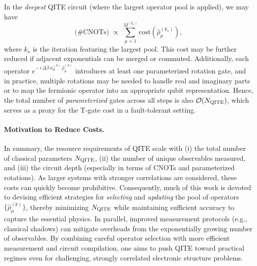 \documentclass[aip,jcp,amsmath,amssymb, reprint]{revtex4-1}
\begin{document}
In the \textit{deepest} QITE circuit (where the largest operator pool is applied), we may have 
\[
\text{(\# CNOTs)} \;\propto\; \sum_{\mu=1}^{M^{(k_\star)}} \!\!\text{cost}(\hat{\rho}_\mu^{(k_\star)}),
\]
where $k_\star$ is the iteration featuring the largest pool. This cost may be further reduced if adjacent exponentials can be merged or commuted.\cite{mcardle2020quantum} Additionally, each operator \(e^{-\,i\,\Delta \beta\,\alpha_\mu^{(k)} \,\hat{\rho}_\mu^{(k)}}\) introduces at least one parameterized rotation gate, and in practice, multiple rotations may be needed to handle real and imaginary parts or to map the fermionic operator into an appropriate qubit representation. Hence, the total number of \textit{parameterized} gates across all steps is also $\mathcal{O}(N_{\rm{QITE}})$, which serves as a proxy for the T-gate cost in a fault-tolerant setting. 

\paragraph{Motivation to Reduce Costs.}
In summary, the resource requirements of QITE scale with (i) the total number of classical parameters $N_{\rm{QITE}}$, (ii) the number of unique observables measured, and (iii) the circuit depth (especially in terms of CNOTs and parameterized rotations). As larger systems with stronger correlations are considered, these costs can quickly become prohibitive. Consequently, much of this work is devoted to devising efficient strategies for \textit{selecting} and \textit{updating} the pool of operators $\{\hat{\rho}_\mu^{(k)}\}$, thereby minimizing $N_{\rm{QITE}}$ while maintaining sufficient accuracy to capture the essential physics. In parallel, improved measurement protocols (e.g., classical shadows) can mitigate overheads from the exponentially growing number of observables. By combining careful operator selection with more efficient measurement and circuit compilation, one aims to push QITE toward practical regimes even for challenging, strongly correlated electronic structure problems.
\end{document}
